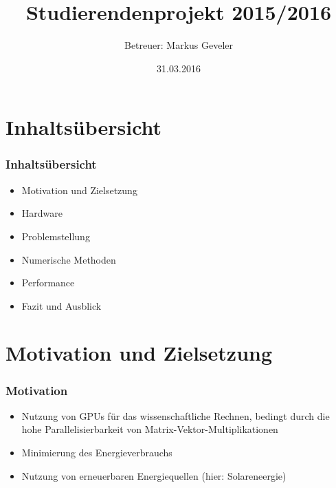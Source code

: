 \documentclass[12pt]{beamer}
\title{Studierendenprojekt 2015/2016}
\author{Betreuer: Markus Geveler}
\institute[TU Dortmund]{
Fakultät für Mathematik \\ TU Dortmund \\
}
\date{31.03.2016}
\begin{document}
\begin{frame}[c]
  \titlepage
\end{frame}

\logo{}

\section{Inhaltsübersicht}

\begin{frame}[c]
\frametitle{Inhaltsübersicht}
\begin{itemize}
\item Motivation und Zielsetzung \\
\item Hardware \\
\item Problemstellung \\
\item Numerische Methoden \\
\item Performance \\
\item Fazit und Ausblick
\end{itemize}
\end{frame}

\section{Motivation und Zielsetzung}

\begin{frame}[c]
\frametitle{Motivation}
\begin{itemize}
\item Nutzung von GPUs für das wissenschaftliche Rechnen, bedingt durch die hohe Parallelisierbarkeit von Matrix-Vektor-Multiplikationen \\
\item Minimierung des Energieverbrauchs \\
\item Nutzung von erneuerbaren Energiequellen (hier: Solareneergie)
\end{itemize}

\end{frame}
\end{document}
